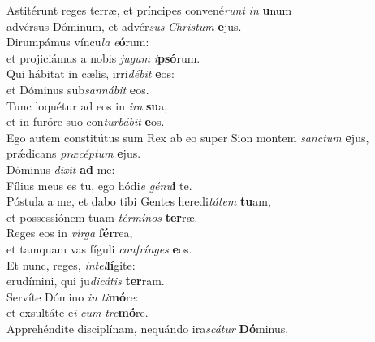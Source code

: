 \evenverse Astitérunt reges terræ, et príncipes convené\textit{runt} \textit{in} \textbf{u}num~\*\\
\evenverse advérsus Dóminum, et advér\textit{sus} \textit{Chri}\textit{stum} \textbf{e}jus.\\
\oddverse Dirumpámus víncu\textit{la} \textit{e}\textbf{ó}rum:~\*\\
\oddverse et projiciámus a nobis \textit{ju}\textit{gum} \textit{i}\textbf{psó}rum.\\
\evenverse Qui hábitat in cælis, irri\textit{dé}\textit{bit} \textbf{e}os:~\*\\
\evenverse et Dóminus sub\textit{san}\textit{ná}\textit{bit} \textbf{e}os.\\
\oddverse Tunc loquétur ad eos in \textit{i}\textit{ra} \textbf{su}a,~\*\\
\oddverse et in furóre suo con\textit{tur}\textit{bá}\textit{bit} \textbf{e}os.\\
\evenverse Ego autem constitútus sum Rex ab eo super Sion montem \textit{san}\textit{ctum} \textbf{e}jus,~\*\\
\evenverse prǽdicans \textit{præ}\textit{cép}\textit{tum} \textbf{e}jus.\\
\oddverse Dóminus \textit{di}\textit{xit} \textbf{ad} me:~\*\\
\oddverse Fílius meus es tu, ego hódi\textit{e} \textit{gé}\textit{nu}\textbf{i} te.\\
\evenverse Póstula a me, et dabo tibi Gentes heredi\textit{tá}\textit{tem} \textbf{tu}am,~\*\\
\evenverse et possessiónem tuam \textit{tér}\textit{mi}\textit{nos} \textbf{ter}ræ.\\
\oddverse Reges eos in \textit{vir}\textit{ga} \textbf{fér}rea,~\*\\
\oddverse et tamquam vas fíguli \textit{con}\textit{frín}\textit{ges} \textbf{e}os.\\
\evenverse Et nunc, reges, \textit{in}\textit{tel}\textbf{lí}gite:~\*\\
\evenverse erudímini, qui ju\textit{di}\textit{cá}\textit{tis} \textbf{ter}ram.\\
\oddverse Servíte Dómino \textit{in} \textit{ti}\textbf{mó}re:~\*\\
\oddverse et exsultáte e\textit{i} \textit{cum} \textit{tre}\textbf{mó}re.\\
\evenverse Apprehéndite disciplínam, nequándo ira\textit{scá}\textit{tur} \textbf{Dó}minus,~\*\\
